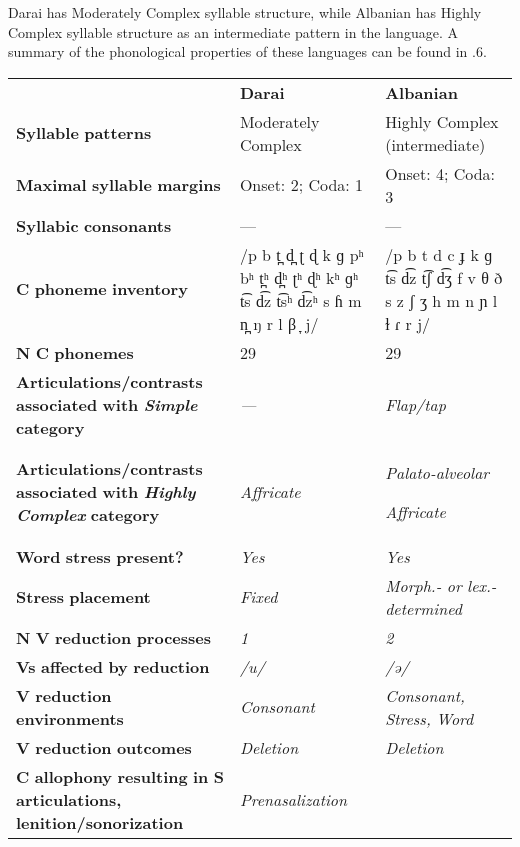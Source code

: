   Darai has Moderately Complex syllable structure, while Albanian has Highly Complex syllable structure as an intermediate pattern in the language. A summary of the phonological properties of these languages can be found in .6.






\begin{table}
\begin{tabularx}{\textwidth}{XXX}
\lsptoprule
 & \textbf{Darai} & \textbf{Albanian}\\
 \textbf{Syllable} \textbf{patterns} & Moderately Complex & Highly Complex (intermediate)\\
 \textbf{Maximal} \textbf{syllable} \textbf{margins} & Onset: 2; Coda: 1 & Onset: 4; Coda: 3\\
 \textbf{Syllabic} \textbf{consonants} & — & —\\
 \textbf{C} \textbf{phoneme} \textbf{inventory} & /p b t̪ d̪ ʈ ɖ k ɡ pʰ bʰ t̪ʰ d̪ʰ ʈʰ ɖʰ kʰ ɡʰ t͡s d͡z t͡sʰ d͡zʰ s ɦ m n̪ ŋ r l β ̞ j/ & /p b t d c ɟ k ɡ t͡s d͡z t͡ʃ d͡ʒ f v θ ð s z ʃ ʒ h m n ɲ l ɫ ɾ r j/\\
 \textbf{N} \textbf{C} \textbf{phonemes} & 29 & 29\\
 \textbf{Articulations/contrasts} \textbf{associated} \textbf{with} \textbf{\textit{Simple}} \textbf{category} & \textit{—} & \textit{Flap/tap}\\
 \textbf{Articulations/contrasts} \textbf{associated} \textbf{with} \textbf{\textit{Highly} \textit{Complex}} \textbf{category} & \textit{Affricate} & { \textit{Palato-alveolar}}

 \textit{Affricate}\\
 \textbf{Word} \textbf{stress} \textbf{present?} & \textit{Yes} & \textit{Yes}\\
 \textbf{Stress} \textbf{placement} & \textit{Fixed} & \textit{Morph.-} \textit{or} \textit{lex.-determined}\\
 \textbf{N} \textbf{V} \textbf{reduction} \textbf{processes} & \textit{1} & \textit{2}\\
 \textbf{Vs} \textbf{affected} \textbf{by} \textbf{reduction}  & \textit{/u/} & \textit{/ə/}\\
 \textbf{V} \textbf{reduction} \textbf{environments} & \textit{Consonant} & \textit{Consonant,} \textit{Stress,} \textit{Word}\\
 \textbf{V} \textbf{reduction} \textbf{outcomes} & \textit{Deletion} & \textit{Deletion}\\
 \textbf{C} \textbf{allophony} \textbf{resulting} \textbf{in} \textbf{S} \textbf{articulations,} \textbf{lenition/sonorization} & { \textit{Prenasalization}}


\end{tabularx}
\end{table}
